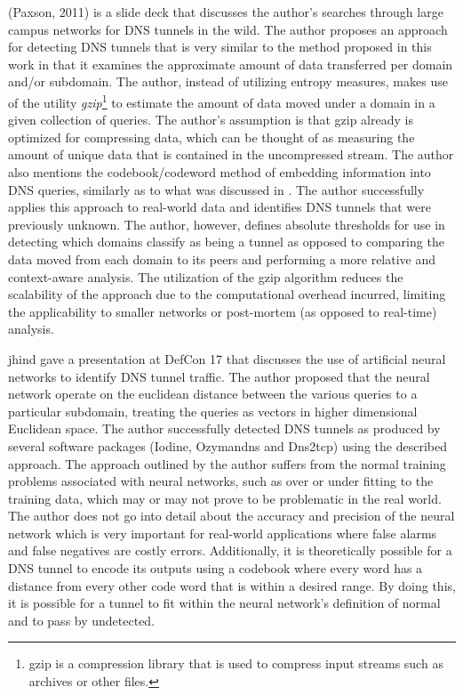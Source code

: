 \documentclass[12pt]{article}
\theoremstyle{remark}
\theoremstyle{definition}
\theoremstyle{definition}
\theoremstyle{definition}
\begin{document}
(Paxson, 2011)\cite{Paxson2011} is a slide deck that discusses the author's searches through large campus networks for DNS tunnels in the wild. The author proposes an approach for detecting DNS tunnels that is very similar to the method proposed in this work in that it examines the approximate amount of data transferred per domain and/or subdomain. The author, instead of utilizing entropy measures, makes use of the utility \emph{gzip}\footnote{gzip is a compression library that is used to compress input streams such as archives or other files.} to estimate the amount of data moved under a domain in a given collection of queries. The author's assumption is that gzip already is optimized for compressing data, which can be thought of as measuring the amount of unique data that is contained in the uncompressed stream. The author also mentions the codebook/codeword method of embedding information into DNS queries, similarly as to what was discussed in \cite{Butler2011}. The author successfully applies this approach to real-world data and identifies DNS tunnels that were previously unknown. The author, however, defines absolute thresholds for use in detecting which domains classify as being a tunnel as opposed to comparing the data moved from each domain to its peers and performing a more relative and context-aware analysis. The utilization of the gzip algorithm reduces the scalability of the approach due to the computational overhead incurred, limiting the applicability to smaller networks or post-mortem (as opposed to real-time) analysis.

jhind\cite{jhind2009} gave a presentation at DefCon 17 that discusses the use of artificial neural networks to identify DNS tunnel traffic. The author proposed that the neural network operate on the euclidean distance between the various queries to a particular subdomain, treating the queries as vectors in higher dimensional Euclidean space. The author successfully detected DNS tunnels as produced by several software packages (Iodine, Ozymandns and Dns2tcp) using the described approach. The approach outlined by the author suffers from the normal training problems associated with neural networks, such as over or under fitting to the training data, which may or may not prove to be problematic in the real world. The author does not go into detail about the accuracy and precision of the neural network which is very important for real-world applications where false alarms and false negatives are costly errors. Additionally, it is theoretically possible for a DNS tunnel to encode its outputs using a codebook where every word has a distance from every other code word that is within a desired range. By doing this, it is possible for a tunnel to fit within the neural network's definition of normal and to pass by undetected.
\end{document}
